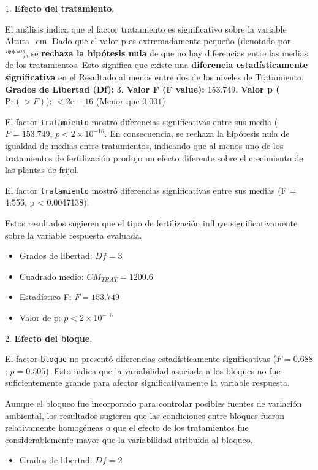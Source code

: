 \documentclass[
  spanish,
  letterpaper,
  DIV=11,
  numbers=noendperiod]{scrreprt}
\providecommand{\tightlist}{%
  \setlength{\itemsep}{0pt}\setlength{\parskip}{0pt}}
\begin{document}
1. \textbf{Efecto del tratamiento}.

El análisis indica que el factor tratamiento es significativo sobre la
variable Altuta\_cm. Dado que el valor \(\text{p}\) es extremadamente
pequeño (denotado por `***'), se \textbf{rechaza la hipótesis nula} de
que no hay diferencias entre las medias de los tratamientos. Esto
significa que existe una \textbf{diferencia estadísticamente
significativa} en el Resultado al menos entre dos de los niveles de
Tratamiento. \textbf{Grados de Libertad (Df):} 3. \textbf{Valor F (F
value):} 153.749. \textbf{Valor p (}\(\text{Pr}(>F)\)):
\(<2 \text{e}-16\) (Menor que \(0.001\))

El factor \texttt{tratamiento} mostró diferencias significativas entre
sus media (\(F=153.749\), \(p < 2 \times 10^{-16}\). En consecuencia, se
rechaza la hipótesis nula de igualdad de medias entre tratamientos,
indicando que al menos uno de los tratamientos de fertilización produjo
un efecto diferente sobre el crecimiento de las plantas de frijol.

El factor \texttt{tratamiento} mostró diferencias significativas entre
sus medias (F = 4.556, p \textless{} 0.0047138).

Estos resultados sugieren que el tipo de fertilización influye
significativamente sobre la variable respuesta evaluada.

\begin{itemize}
\item
  Grados de libertad: \(Df=3\)
\item
  Cuadrado medio: \(CM_{TRAT} = 1200.6\)
\item
  Estadístico F: \(F = 153.749\)
\item
  Valor de p: \(p < 2 \times 10^{-16}\)
\end{itemize}

2. \textbf{Efecto del bloque.}

El factor \texttt{bloque} no presentó diferencias estadísticamente
significativas (\(F = 0.688\); \(p = 0.505\)). Esto indica que la
variabilidad asociada a los bloques no fue suficientemente grande para
afectar significativamente la variable respuesta.

Aunque el bloqueo fue incorporado para controlar posibles fuentes de
variación ambiental, los resultados sugieren que las condiciones entre
bloques fueron relativamente homogéneas o que el efecto de los
tratamientos fue considerablemente mayor que la variabilidad atribuida
al bloqueo.

\begin{itemize}
\tightlist
\item
  Grados de libertad: \(Df = 2\)
\end{itemize}
\end{document}
